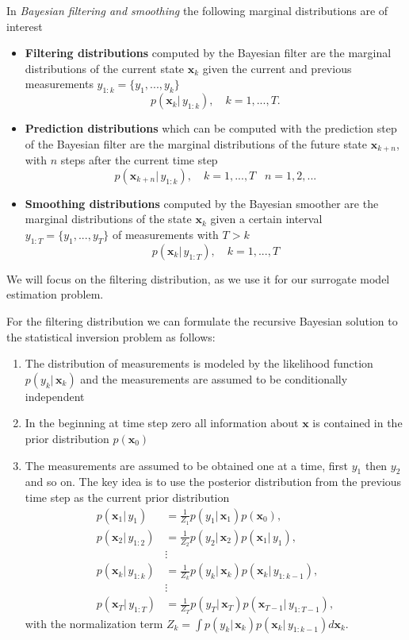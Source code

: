 In \textit{Bayesian filtering and smoothing} the following marginal
distributions are of interest

\begin{itemize}
\item \textbf{Filtering distributions} computed by the
  Bayesian filter are the marginal distributions of the
  current state $\mathbf{x}_k$ given the current and previous measurements
  $y_{1:k} = \{y_1,...,y_k\}$
  $$ p(\mathbf{x}_k |\, y_{1:k}), \quad k = 1,...,T.$$
\item \textbf{Prediction distributions} which can be computed with
  the prediction step of the Bayesian filter are the marginal
  distributions of the future state $\mathbf{x}_{k+n}$, with $n$ steps
  after the current time step
  $$ p(\mathbf{x}_{k+n} |\, y_{1:k}), \quad k = 1,...,T \;\;\; n = 1,2,...$$
\item \textbf{Smoothing distributions} computed by the Bayesian smoother
  are the marginal distributions of the state $\mathbf{x}_k$ given
  a certain interval $y_{1:T} = \{y_1,...,y_T\}$ of measurements with
  $T > k$
  $$ p(\mathbf{x}_k |\, y_{1:T}), \quad k = 1,...,T$$
\end{itemize}


We will focus on the filtering distribution,
as we use it for our surrogate model estimation problem.

For the filtering distribution we can formulate the recursive Bayesian
solution to the statistical inversion problem as follows:
\begin{enumerate}
\item The distribution of measurements is modeled by the likelihood
  function $p(y_k |\, \mathbf{x}_k)$ and the measurements are assumed
  to be conditionally independent
\item In the beginning at time step zero all information about $\mathbf{x}$
  is contained in the prior distribution $p(\mathbf{x}_0)$
\item The measurements are assumed to be obtained one at a time,
  first $y_1$ then $y_2$ and so on. The key idea is to use the posterior
  distribution from the previous time step as the current prior
  distribution
  \begin{align*}
    p(\mathbf{x}_1 |\, y_{1})
    &= \frac{1}{Z_1} p(y_1 |\, \mathbf{x}_1) p(\mathbf{x}_0), \\
    p(\mathbf{x}_2 |\, y_{1:2})
    &= \frac{1}{Z_2} p(y_2 |\, \mathbf{x}_2) p(\mathbf{x}_1 |\, y_1), \\
                            &\vdots \\
    p(\mathbf{x}_k |\, y_{1:k})
    &= \frac{1}{Z_k} p(y_k |\, \mathbf{x}_k) p(\mathbf{x}_k |\, y_{1:k-1}), \\
                            &\vdots \\
    p(\mathbf{x}_T |\, y_{1:T})
    &= \frac{1}{Z_T} p(y_T |\, \mathbf{x}_T) p(\mathbf{x}_{T-1} |\, y_{1:T-1}),
  \end{align*}
  with the normalization term $Z_k = \int p(y_k |\, \mathbf{x}_k)
  p(\mathbf{x}_k |\, y_{1:k-1})
  d \mathbf{x}_k$. 
\end{enumerate}

